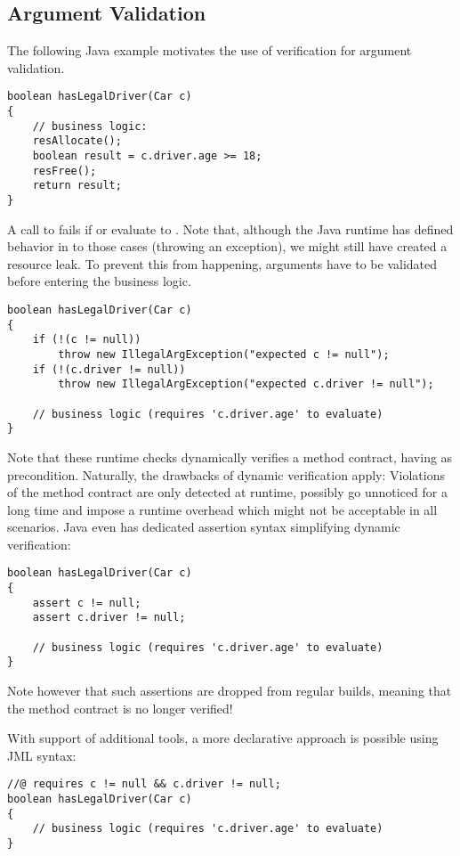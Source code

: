 
\subsection{Argument Validation}
The following Java example motivates the use of verification for argument validation.
\begin{lstlisting}
boolean hasLegalDriver(Car c)
{
    // business logic:
    resAllocate();
    boolean result = c.driver.age >= 18;
    resFree();
    return result;
}
\end{lstlisting}
A call to  fails if  or  evaluate to .
Note that, although the Java runtime has defined behavior in to those cases (throwing an exception), we might still have created a resource leak.
To prevent this from happening, arguments have to be validated before entering the business logic.
\begin{lstlisting}
boolean hasLegalDriver(Car c)
{
    if (!(c != null))
        throw new IllegalArgException("expected c != null");
    if (!(c.driver != null))
        throw new IllegalArgException("expected c.driver != null");
        
    // business logic (requires 'c.driver.age' to evaluate)
}
\end{lstlisting}

Note that these runtime checks dynamically verifies a method contract, having  as precondition.
Naturally, the drawbacks of dynamic verification apply:
Violations of the method contract are only detected at runtime, possibly go unnoticed for a long time and impose a runtime overhead which might not be acceptable in all scenarios.
Java even has dedicated assertion syntax simplifying dynamic verification:
\begin{lstlisting}
boolean hasLegalDriver(Car c)
{
    assert c != null;
    assert c.driver != null;

    // business logic (requires 'c.driver.age' to evaluate)
}
\end{lstlisting}
Note however that such assertions are dropped from regular builds, meaning that the method contract is no longer verified!

With support of additional tools, a more declarative approach is possible using JML syntax:
\begin{lstlisting}
//@ requires c != null && c.driver != null;
boolean hasLegalDriver(Car c)
{
    // business logic (requires 'c.driver.age' to evaluate)
}
\end{lstlisting}

